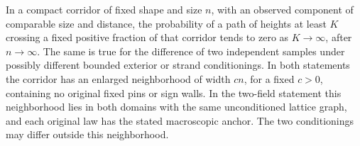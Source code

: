 \begin{lemma}\label{g:high-crossing}
In a compact corridor of fixed shape and size \(n\), with an observed
component of comparable size and distance, the probability of a path
of heights at least \(K\) crossing a fixed positive fraction of that
corridor tends to zero as \(K\to\infty\), after \(n\to\infty\).
The same is true for the difference of two independent samples under
possibly different bounded exterior or strand conditionings.
In both statements the corridor has an enlarged neighborhood of
width \(cn\), for a fixed \(c>0\), containing no original fixed pins
or sign walls. In the two-field statement this neighborhood lies
in both domains with the same unconditioned lattice graph, and
each original law has the stated macroscopic anchor. The two
conditionings may differ outside this neighborhood.
\end{lemma}

